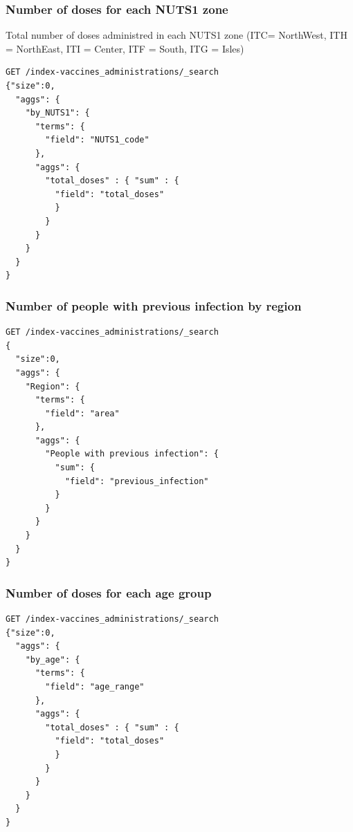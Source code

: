 \documentclass[12pt, a4paper]{article}
\begin{document}
\noindent
\blindtext

\subsubsection{Number of doses for each NUTS1 zone}
Total number of doses administred in each NUTS1 zone (ITC= NorthWest, ITH = NorthEast, ITI = Center, ITF = South, ITG = Isles)
\begin{tcolorbox}[fontupper=\scriptsize]
    \begin{verbatim}
GET /index-vaccines_administrations/_search
{"size":0,
  "aggs": {
    "by_NUTS1": {
      "terms": {
        "field": "NUTS1_code"
      },
      "aggs": {
        "total_doses" : { "sum" : {
          "field": "total_doses"
          }
        }
      }
    }
  }
}
    \end{verbatim}
\end{tcolorbox}

\noindent
\blindtext

\subsubsection{Number of people with previous infection by region}

\begin{tcolorbox}[fontupper=\scriptsize]
    \begin{verbatim}
GET /index-vaccines_administrations/_search
{
  "size":0,
  "aggs": {
    "Region": {
      "terms": {
        "field": "area"
      },
      "aggs": {
        "People with previous infection": {
          "sum": {
            "field": "previous_infection"
          }
        }
      }
    }
  }
}
    \end{verbatim}
\end{tcolorbox}

\noindent
\blindtext

\subsubsection{Number of doses for each age group}

\begin{tcolorbox}[fontupper=\scriptsize]
    \begin{verbatim}
GET /index-vaccines_administrations/_search
{"size":0,
  "aggs": {
    "by_age": {
      "terms": {
        "field": "age_range"
      },
      "aggs": {
        "total_doses" : { "sum" : { 
          "field": "total_doses"
          }
        }
      }
    }
  }
}

    \end{verbatim}
\end{tcolorbox}
\end{document}
